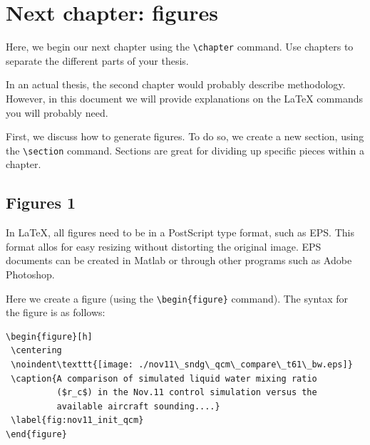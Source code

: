 \documentclass[master]{UWMThesis}
\begin{document}
\chapter{Next chapter: figures}  \label{sec:chap_figs}

Here, we begin our next chapter using the \verb=\chapter= command.  Use chapters to separate the different parts of your thesis.

In an actual thesis, the second chapter would probably describe methodology.  However, in this document we will provide explanations on the LaTeX commands you will probably need.

First, we discuss how to generate figures.  To do so, we create a new section, using the \verb=\section= command.  Sections are great for dividing up specific pieces within a chapter.

	\section{Figures 1} \label{sec:fig1}
  In LaTeX, all figures need to be in a PostScript type format, such as EPS.  This format allos for easy resizing without distorting the original image.  EPS documents can be created in Matlab or through other programs such as Adobe Photoshop.
	
	Here we create a figure (using the \verb=\begin{figure}= command).  The syntax for the figure is as follows:

\begin{verbatim}
\begin{figure}[h]
 \centering
 \noindent\texttt{[image: ./nov11\_sndg\_qcm\_compare\_t61\_bw.eps]}
 \caption{A comparison of simulated liquid water mixing ratio
          ($r_c$) in the Nov.11 control simulation versus the
          available aircraft sounding....}
 \label{fig:nov11_init_qcm}
\end{figure}
\end{verbatim}
\end{document}
